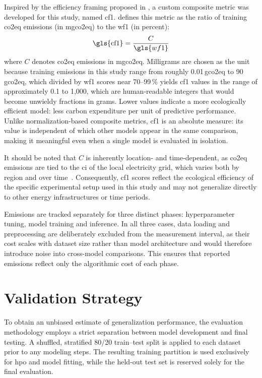 Inspired by the efficiency framing proposed in \citeauthor{schwartzGreenAI2020} \cite{schwartzGreenAI2020}, a custom composite metric was developed for this study, named \gls{cf1}.  defines this metric as the ratio of training \gls{co2eq} emissions (in \gls{mgco2eq}) to the \gls{wf1} (in percent):
\begin{equation}
\text{\gls{cf1}} = \frac{C}{\gls{wf1}}
\label{eq:cf1}
\end{equation}
where $C$ denotes \gls{co2eq} emissions in \gls{mgco2eq}. Milligrams are chosen as the unit because training emissions in this study range from roughly 0.01\,\gls{gco2eq} to 90\,\gls{gco2eq}, which divided by \gls{wf1} scores near 70--99\,\% yields \gls{cf1} values in the range of approximately 0.1 to 1{,}000, which are human-readable integers that would become unwieldy fractions in grams. Lower values indicate a more ecologically efficient model: less carbon expenditure per unit of predictive performance. Unlike normalization-based composite metrics, \gls{cf1} is an absolute measure: its value is independent of which other models appear in the same comparison, making it meaningful even when a single model is evaluated in isolation.

It should be noted that $C$ is inherently location- and time-dependent, as \gls{co2eq} emissions are tied to the \gls{ci} of the local electricity grid, which varies both by region and over time~\cite{wrightEfficiencyNotEnough2025}. Consequently, \gls{cf1} scores reflect the ecological efficiency of the specific experimental setup used in this study and may not generalize directly to other energy infrastructures or time periods.

Emissions are tracked separately for three distinct phases: hyperparameter tuning, model training and inference. In all three cases, data loading and preprocessing are deliberately excluded from the measurement interval, as their cost scales with dataset size rather than model architecture and would therefore introduce noise into cross-model comparisons. This ensures that reported emissions reflect only the algorithmic cost of each phase.

\section{Validation Strategy}
\label{design_validation}

To obtain an unbiased estimate of generalization performance, the evaluation methodology employs a strict separation between model development and final testing. A shuffled, stratified 80/20 train--test split is applied to each dataset prior to any modeling steps. The resulting training partition is used exclusively for \gls{hpo} and model fitting, while the held-out test set is reserved solely for the final evaluation.

